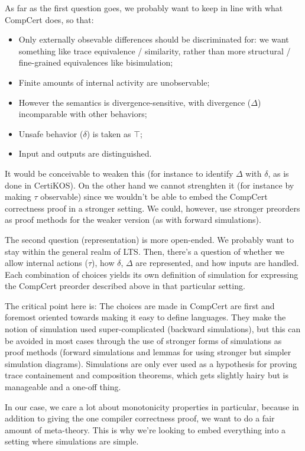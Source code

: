 \documentclass[11pt]{article}
\begin{document}
As far as the first question goes,
we probably want to keep in line with what CompCert does,
so that:
\begin{itemize}
\item Only externally obsevable differences should be discriminated for:
  we want something like trace equivalence / similarity,
  rather than more structural / fine-grained equivalences like bisimulation;
\item Finite amounts of internal activity are unobservable;
\item However the semantics is divergence-sensitive,
  with divergence ($\Delta$) incomparable with other behaviors;
\item Unsafe behavior ($\delta$) is taken as $\top$;
\item Input and outputs are distinguished.
\end{itemize}
It would be conceivable to weaken this
(for instance to identify $\Delta$ with $\delta$,
as is done in CertiKOS).
On the other hand we cannot strenghten it
(for instance by making $\tau$ observable)
since we wouldn't be able to embed
the CompCert correctness proof in a stronger setting.
We could, however,
use stronger preorders as proof methods
for the weaker version
(as with forward simulations).

The second question (representation) is more open-ended.
We probably want to stay within the general realm of LTS.
Then, there's a question of
whether we allow internal actions ($\tau$),
how $\delta$, $\Delta$ are represented,
and how inputs are handled.
Each combination of choices yields
its own definition of simulation for
expressing the CompCert preorder described above
in that particular setting.

The critical point here is:
The choices are made in CompCert
are first and foremost oriented towards
making it easy to define languages.
They make the notion of simulation used
super-complicated (backward simulations),
but this can be avoided in most cases
through the use of stronger forms of simulations
as proof methods
(forward simulations and
lemmas for using stronger but simpler simulation diagrams).
Simulations are only ever used as a hypothesis
for proving trace containement
and composition theorems,
which gets slightly hairy but is manageable
and a one-off thing.

In our case,
we care a lot about monotonicity properties in particular,
because in addition to giving the one compiler correctness proof,
we want to do a fair amount of meta-theory.
This is why we're looking to embed everything
into a setting where simulations are simple.
\end{document}
